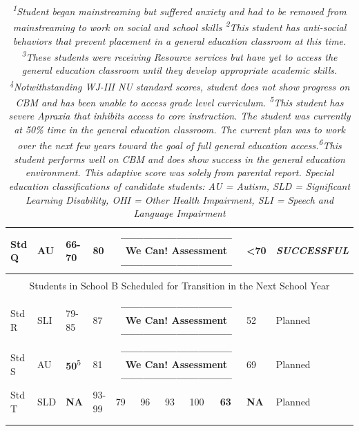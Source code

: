 \documentclass[twoside]{article}
\begin{document}
\begin{tiny}
\begin{landscape}
\begin{longtable}{p{1.5cm}p{1.5cm}p{1.5cm}p{1.5cm}p{1.75cm}p{1.75cm}p{1.75cm}p{1.75cm}p{1.75cm}p{1.75cm}p{2.5cm}@{}}
Std Q & AU & 66-70 & 80 & \multicolumn{5}{c}{\textbf{------------------------------We Can! Assessment------------------------------}} & \textless70 & \textbf{\textit{SUCCESSFUL}}\\
\hline\\
\multicolumn{11}{c}{Students in School B Scheduled for Transition in the Next School Year}\\
\hline\\
Std R & SLI & 79-85 & 87 & \multicolumn{5}{c}{\textbf{------------------------------We Can! Assessment------------------------------}} & 52 & Planned\\
Std S & AU & \textbf{50}\textsuperscript{5} & 81 & \multicolumn{5}{c}{\textbf{------------------------------We Can! Assessment------------------------------}} & 69 & Planned\\
Std T & SLD & \textbf{NA} & 93-99 & 79 & 96 & 93 & 100 & \textbf{63} & \textbf{NA} & Planned\\
\hline\\
\caption*{\textit{\textsuperscript{1}Student began mainstreaming but suffered anxiety and had to be removed from mainstreaming to work on social and school skills \textsuperscript{2}This student has anti-social behaviors that prevent placement in a general education classroom at this time. \textsuperscript{3}These students were receiving Resource services but have yet to access the general education classroom until they develop appropriate academic skills. \textsuperscript{4}Notwithstanding WJ-III NU standard scores, student does not show progress on CBM and has been unable to access grade level curriculum. \textsuperscript{5}This student has severe Apraxia that inhibits access to core instruction. The student was currently at 50\% time in the general education classroom. The current plan was to work over the next few years toward the goal of full general education access.\textsuperscript{6}This student performs well on CBM and does show success in the general education environment. This adaptive score was solely from parental report. Special education classifications of candidate students: AU = Autism, SLD = Significant Learning Disability, OHI = Other Health Impairment, SLI = Speech and Language Impairment}}
\end{longtable}
\end{landscape}
\end{tiny}
%
%
%
%
%
\clearpage
\end{document}
